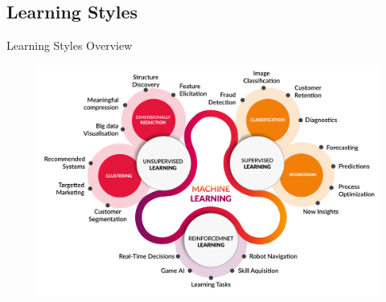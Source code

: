 \documentclass[document.tex]{subfiles}
\begin{document}
    \subsection{Learning Styles}
    
    \begin{frame}{Learning Styles Overview}
        \begin{figure}
            \label{fig:learning-styles}
            \includegraphics[width=.7\textwidth]{figures/external/learning-styles.png}
        \end{figure}
    \end{frame}
\end{document}
